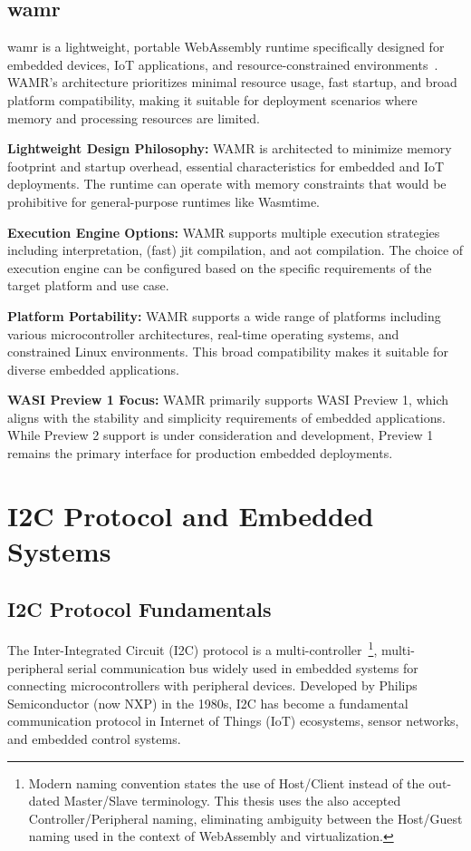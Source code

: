 \subsection{\acrfull{wamr}}
\label{subsec:wamr}

\acrshort{wamr} is a lightweight, portable WebAssembly runtime specifically designed for embedded devices, IoT applications, and resource-constrained environments\cite{wamr_project}~\cite{wamr_project2}. WAMR's architecture prioritizes minimal resource usage, fast startup, and broad platform compatibility, making it suitable for deployment scenarios where memory and processing resources are limited.

\textbf{Lightweight Design Philosophy:} WAMR is architected to minimize memory footprint and startup overhead, essential characteristics for embedded and IoT deployments. The runtime can operate with memory constraints that would be prohibitive for general-purpose runtimes like Wasmtime.

\textbf{Execution Engine Options:} WAMR supports multiple execution strategies including interpretation, (fast) \acrshort{jit} compilation, and \acrshort{aot} compilation. The choice of execution engine can be configured based on the specific requirements of the target platform and use case.

\textbf{Platform Portability:} WAMR supports a wide range of platforms including various microcontroller architectures, real-time operating systems, and constrained Linux environments. This broad compatibility makes it suitable for diverse embedded applications.

\textbf{WASI Preview 1 Focus:} WAMR primarily supports WASI Preview 1, which aligns with the stability and simplicity requirements of embedded applications. While Preview 2 support is under consideration and development, Preview 1 remains the primary interface for production embedded deployments.

\section{I2C Protocol and Embedded Systems}
\label{sec:i2c-embedded}

\subsection{I2C Protocol Fundamentals}
\label{subsec:i2c-fundamentals}

The Inter-Integrated Circuit (I2C) protocol is a multi-controller~\footnote{Modern naming convention states the use of Host/Client instead of the out-dated Master/Slave terminology. This thesis uses the also accepted Controller/Peripheral naming, eliminating ambiguity between the Host/Guest naming used in the context of WebAssembly and virtualization.}, multi-peripheral serial communication bus widely used in embedded systems for connecting microcontrollers with peripheral devices\cite{i2c_specification}. Developed by Philips Semiconductor (now NXP) in the 1980s, I2C has become a fundamental communication protocol in Internet of Things (IoT) ecosystems, sensor networks, and embedded control systems.

